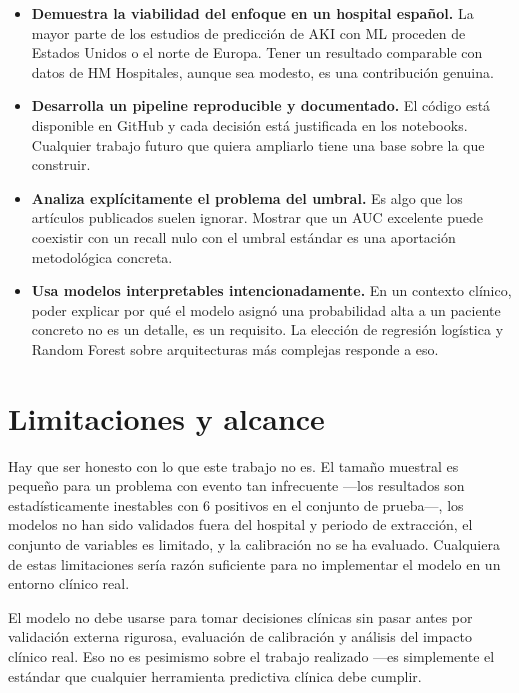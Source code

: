 \documentclass[12pt, a4paper, oneside]{report}
\begin{document}
\begin{itemize}
    \item \textbf{Demuestra la viabilidad del enfoque en un hospital español.} La mayor parte de los estudios de predicción de AKI con ML proceden de Estados Unidos o el norte de Europa. Tener un resultado comparable con datos de HM Hospitales, aunque sea modesto, es una contribución genuina.
    
    \item \textbf{Desarrolla un pipeline reproducible y documentado.} El código está disponible en GitHub y cada decisión está justificada en los notebooks. Cualquier trabajo futuro que quiera ampliarlo tiene una base sobre la que construir.
    
    \item \textbf{Analiza explícitamente el problema del umbral.} Es algo que los artículos publicados suelen ignorar. Mostrar que un AUC excelente puede coexistir con un recall nulo con el umbral estándar es una aportación metodológica concreta.
    
    \item \textbf{Usa modelos interpretables intencionadamente.} En un contexto clínico, poder explicar por qué el modelo asignó una probabilidad alta a un paciente concreto no es un detalle, es un requisito. La elección de regresión logística y Random Forest sobre arquitecturas más complejas responde a eso.
\end{itemize}

\section{Limitaciones y alcance}

Hay que ser honesto con lo que este trabajo no es. El tamaño muestral es pequeño para un problema con evento tan infrecuente —los resultados son estadísticamente inestables con 6 positivos en el conjunto de prueba—, los modelos no han sido validados fuera del hospital y periodo de extracción, el conjunto de variables es limitado, y la calibración no se ha evaluado. Cualquiera de estas limitaciones sería razón suficiente para no implementar el modelo en un entorno clínico real.

El modelo no debe usarse para tomar decisiones clínicas sin pasar antes por validación externa rigurosa, evaluación de calibración y análisis del impacto clínico real. Eso no es pesimismo sobre el trabajo realizado —es simplemente el estándar que cualquier herramienta predictiva clínica debe cumplir.
\end{document}
